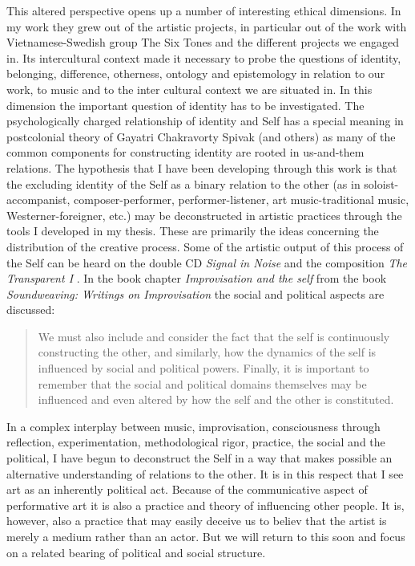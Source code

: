 \documentclass{article}
\begin{document}
This altered perspective opens up a number of interesting ethical dimensions. In my work they grew out of the artistic projects, in particular out of the work with Vietnamese-Swedish group The Six Tones and the different projects we engaged in. Its intercultural context made it necessary to probe the questions of identity, belonging, difference, otherness, ontology and epistemology in relation to our work, to music and to the inter cultural context we are situated in. In this dimension the important question of identity has to be investigated. The psychologically charged relationship of identity and Self has a special meaning in postcolonial theory of Gayatri Chakravorty Spivak (and others) as many of the common components for constructing identity are rooted in us-and-them relations. The hypothesis that I have been developing through this work is that the excluding identity of the Self as a binary relation to the other (as in soloist-accompanist, composer-performer, performer-listener, art music-traditional music, Westerner-foreigner, etc.) may be deconstructed in artistic practices through the tools I developed in my thesis. These are primarily the ideas concerning the distribution of the creative process. Some of the artistic output of this process of the Self can be heard on the double CD \emph{Signal in Noise} \citep{sixtones13} and the composition \emph{The Transparent I} \citep{frisk-transparent}. In the book chapter \emph{Improvisation and the self} \citep{frisk12-improv} from the book \emph{Soundweaving: Writings on Improvisation} the social and political aspects are discussed:

\begin{quote}
  We must also include and consider the fact that the self is
  continuously constructing the other, and similarly, how the dynamics
  of the self is influenced by social and political powers. Finally,
  it is important to remember that the social and political domains
  themselves may be influenced and even altered by how the self and
  the other is constituted.
\end{quote}

In a complex interplay between music, improvisation, consciousness through reflection, experimentation, methodological rigor, practice, the social and the political, I have begun to deconstruct the Self in a way that makes possible an alternative understanding of relations to the other. It is in this respect that I see art as an inherently political act. Because of the communicative aspect of performative art it is also a practice and theory of influencing other people. It is, however, also a practice that may easily deceive us to believ that the artist is merely a medium rather than an actor. But we will return to this soon and focus on a related bearing of political and social structure.
\end{document}
